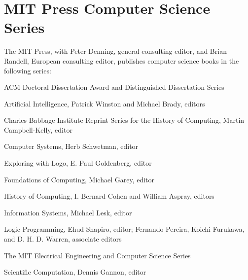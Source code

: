 \chapter*{MIT Press Computer Science Series}

The MIT Press, with Peter Denning, general consulting editor, and
Brian Randell, European consulting editor, publishes computer science books
in the following series:

\begingroup
\setlength{\parindent}{0pt}
\setlength{\parskip}{0.7\baselineskip}

ACM Doctoral Dissertation Award and Distinguished Dissertation Series

Artificial Intelligence, Patrick Winston and Michael Brady, editors

Charles Babbage Institute Reprint Series for the History of Computing,
Martin Campbell-Kelly, editor

Computer Systems, Herb Schwetman, editor

Exploring with Logo, E. Paul Goldenberg, editor

Foundations of Computing, Michael Garey, editor

History of Computing, I. Bernard Cohen and William Aspray, editors

Information Systems, Michael Lesk, editor

Logic Programming, Ehud Shapiro, editor; Fernando Pereira, Koichi
Furukawa, and D. H. D. Warren, associate editors

The MIT Electrical Engineering and Computer Science Series

Scientific Computation, Dennis Gannon, editor
\par\endgroup


